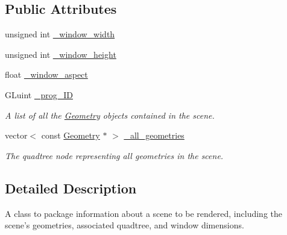 \subsection*{Public Attributes}
\begin{DoxyCompactItemize}
\item 
unsigned int \hyperlink{class_scene_a9857688fb9c3a52be5e6b7551d7e3af8}{\+\_\+window\+\_\+width}
\item 
unsigned int \hyperlink{class_scene_a4a9a7b4b69981efd9ffddfb7d4205806}{\+\_\+window\+\_\+height}
\item 
float \hyperlink{class_scene_aa5d5f322f50e6518e88501fa5481eca9}{\+\_\+window\+\_\+aspect}
\item 
G\+Luint \hyperlink{class_scene_a30e431c913372130cd9f97c0c1e3d75e}{\+\_\+prog\+\_\+\+I\+D}
\begin{DoxyCompactList}\small\item\em A list of all the \hyperlink{class_geometry}{Geometry} objects contained in the scene. \end{DoxyCompactList}\item 
vector$<$ const \hyperlink{class_geometry}{Geometry} $\ast$ $>$ \hyperlink{class_scene_ae4e39aee440d748c4dc14a5aad13825d}{\+\_\+all\+\_\+geometries}
\begin{DoxyCompactList}\small\item\em The quadtree node representing all geometries in the scene. \end{DoxyCompactList}\end{DoxyCompactItemize}


\subsection{Detailed Description}
A class to package information about a scene to be rendered, including the scene's geometries, associated quadtree, and window dimensions. 

